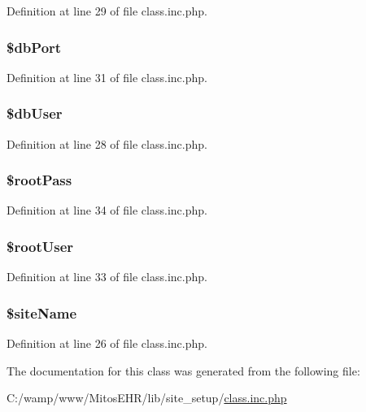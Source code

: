 \-Definition at line 29 of file class.\-inc.\-php.

\hypertarget{class_site_setup_a99190403b1a8a26d11f557a1f5f17569}{
\subsubsection[{\$db\-Port}]{\setlength{\rightskip}{0pt plus 5cm}\$db\-Port}}\label{class_site_setup_a99190403b1a8a26d11f557a1f5f17569}


\-Definition at line 31 of file class.\-inc.\-php.

\hypertarget{class_site_setup_a4a92606de85aafdc0dcae4976b7ca669}{
\subsubsection[{\$db\-User}]{\setlength{\rightskip}{0pt plus 5cm}\$db\-User}}\label{class_site_setup_a4a92606de85aafdc0dcae4976b7ca669}


\-Definition at line 28 of file class.\-inc.\-php.

\hypertarget{class_site_setup_ac6854f08de98c5582791896342dc642a}{
\subsubsection[{\$root\-Pass}]{\setlength{\rightskip}{0pt plus 5cm}\$root\-Pass}}\label{class_site_setup_ac6854f08de98c5582791896342dc642a}


\-Definition at line 34 of file class.\-inc.\-php.

\hypertarget{class_site_setup_a3f35bf16cf11e36d7c259b7e13fdc5da}{
\subsubsection[{\$root\-User}]{\setlength{\rightskip}{0pt plus 5cm}\$root\-User}}\label{class_site_setup_a3f35bf16cf11e36d7c259b7e13fdc5da}


\-Definition at line 33 of file class.\-inc.\-php.

\hypertarget{class_site_setup_a296a20be1920df6367f48f50f08df9f2}{
\subsubsection[{\$site\-Name}]{\setlength{\rightskip}{0pt plus 5cm}\$site\-Name}}\label{class_site_setup_a296a20be1920df6367f48f50f08df9f2}


\-Definition at line 26 of file class.\-inc.\-php.



\-The documentation for this class was generated from the following file\-:\begin{DoxyCompactItemize}
\item 
\-C\-:/wamp/www/\-Mitos\-E\-H\-R/lib/site\-\_\-setup/\hyperlink{class_8inc_8php}{class.\-inc.\-php}\end{DoxyCompactItemize}
